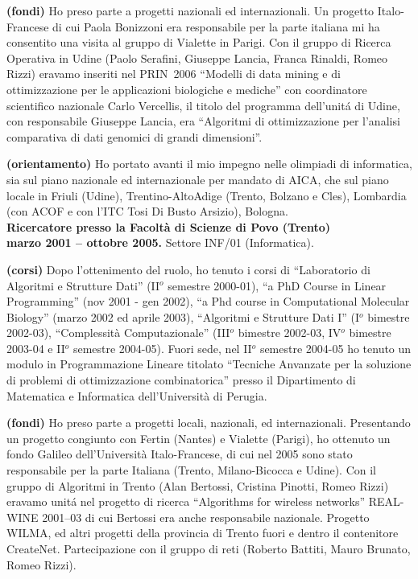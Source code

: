 \documentclass[10pt]{article}
\newcommand{\subvoice}[1] { {\large \bf #1} \smallskip\\ }
\begin{document}
{\bf (fondi)} Ho preso parte a progetti nazionali ed internazionali.
Un progetto Italo-Francese di cui Paola Bonizzoni era responsabile per la parte italiana
mi ha consentito una visita al gruppo di Vialette in Parigi.
Con il gruppo di Ricerca Operativa in Udine (Paolo Serafini, Giuseppe Lancia, Franca Rinaldi, Romeo Rizzi) eravamo inseriti nel PRIN~2006 ``Modelli di data mining e di ottimizzazione per le applicazioni biologiche e mediche'' con coordinatore scientifico nazionale Carlo Vercellis, il titolo del programma dell'unit\'a di Udine, con responsabile Giuseppe Lancia,
era ``Algoritmi di ottimizzazione per l'analisi comparativa di dati genomici di grandi dimensioni''.

{\bf (orientamento)} Ho portato avanti il mio impegno nelle olimpiadi di informatica,
sia sul piano nazionale ed internazionale per mandato di AICA,
che sul piano locale in Friuli (Udine), Trentino-AltoAdige (Trento, Bolzano e Cles), Lombardia (con ACOF e con l'ITC Tosi Di Busto Arsizio), Bologna.\\



\subvoice{Ricercatore presso la
          Facolt\`a di Scienze di Povo (Trento)}
{\bf marzo 2001 -- ottobre 2005.}
Settore INF/01 (Informatica).

{\bf (corsi)} Dopo l'ottenimento del ruolo,
ho tenuto i corsi di ``Laboratorio di Algoritmi e Strutture Dati''
(II$^o$ semestre 2000-01),
``a PhD Course in Linear Programming'' (nov 2001 - gen 2002),
``a Phd course in Computational Molecular Biology'' (marzo 2002 ed aprile 2003),
``Algoritmi e Strutture Dati I'' (I$^o$ bimestre 2002-03),
``Complessit\`a Computazionale'' (III$^o$ bimestre 2002-03,
IV$^o$ bimestre 2003-04 e II$^o$ semestre 2004-05).
Fuori sede, nel II$^o$ semestre 2004-05
ho tenuto un modulo in Programmazione Lineare
titolato ``Tecniche Anvanzate per la soluzione di problemi di ottimizzazione
combinatorica''
presso il Dipartimento di Matematica e Informatica
dell'Universit\`a di Perugia.

{\bf (fondi)} Ho preso parte a progetti locali, nazionali, ed internazionali.
Presentando un progetto congiunto con Fertin (Nantes) e Vialette (Parigi),
ho ottenuto un fondo Galileo dell'Universit\`a Italo-Francese,
di cui nel 2005 sono stato responsabile
per la parte Italiana (Trento, Milano-Bicocca e Udine).
Con il gruppo di Algoritmi in Trento (Alan Bertossi, Cristina Pinotti, Romeo Rizzi)
eravamo unit\'a nel progetto di ricerca ``Algorithms for wireless networks''
REAL-WINE 2001--03 di cui Bertossi era anche responsabile nazionale.
Progetto WILMA, ed altri progetti della provincia di Trento fuori e dentro il contenitore CreateNet. Partecipazione con il gruppo di reti (Roberto Battiti, Mauro Brunato, Romeo Rizzi).
\end{document}
